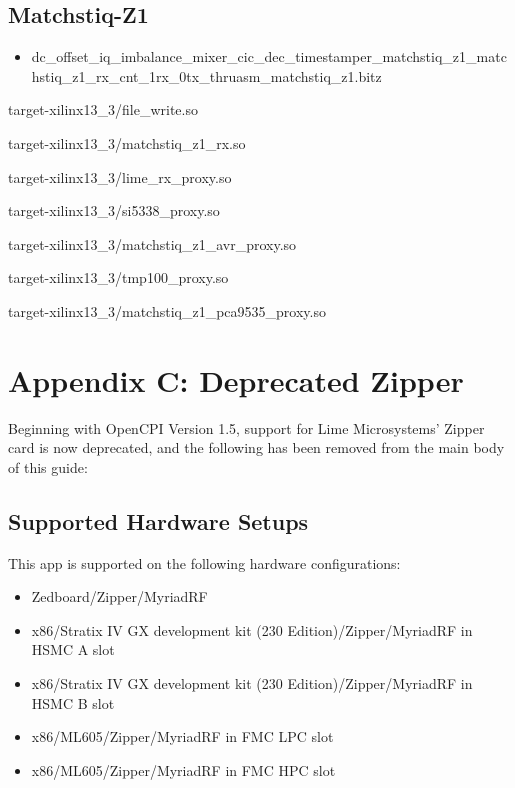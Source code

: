 \subsection{Matchstiq-Z1}
	\begin{itemize}
	\item
dc\_offset\_iq\_imbalance\_mixer\_cic\_dec\_timestamper\_matchstiq\_z1\_matchstiq\_z1\_rx\_cnt\_1rx\_0tx\_thruasm\_matchstiq\_z1.bitz
	\end{itemize}
	\begin{itemize}
	\begin{minipage}[t]{.5\textwidth}
	\item target-xilinx13\_3/file\_write.so
	\item target-xilinx13\_3/matchstiq\_z1\_rx.so
	\item target-xilinx13\_3/lime\_rx\_proxy.so
	\end{minipage}
	\begin{minipage}[t]{.5\textwidth}
	\item target-xilinx13\_3/si5338\_proxy.so
	\item target-xilinx13\_3/matchstiq\_z1\_avr\_proxy.so
	\item target-xilinx13\_3/tmp100\_proxy.so
	\item target-xilinx13\_3/matchstiq\_z1\_pca9535\_proxy.so
	\end{minipage}
	\end{itemize}


\pagebreak
\section{Appendix C: Deprecated Zipper}
Beginning with OpenCPI Version 1.5, support for Lime Microsystems' Zipper card is now deprecated, and the following has been removed from the main body of this guide:\medskip
\subsection{Supported Hardware Setups}
This app is supported on the following hardware configurations:
\begin{itemize}
  \item Zedboard/Zipper/MyriadRF
  \item x86/Stratix IV GX development kit (230 Edition)/Zipper/MyriadRF in HSMC A slot
  \item x86/Stratix IV GX development kit (230 Edition)/Zipper/MyriadRF in HSMC B slot
  \item x86/ML605/Zipper/MyriadRF in FMC LPC slot
  \item x86/ML605/Zipper/MyriadRF in FMC HPC slot
\end{itemize}

